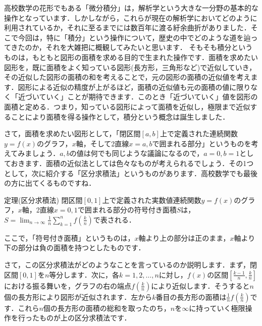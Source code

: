 


高校数学の花形でもある「微分積分」は，解析学という大きな一分野の基本的な操作となっています．しかしながら，これらが現在の解析学においてどのように利用されているか，それに至るまでには数百年に渡る紆余曲折がありました．そこで今回は，特に「積分」という操作について，歴史の中でどのような道を辿ってきたのか，それを大雑把に概観してみたいと思います．
そもそも積分というものは，もともと図形の面積を求める目的で生まれた操作です．面積を求めたい図形を，既に面積をよく知っている図形(長方形，三角形など)で近似していき，その近似した図形の面積の和を考えることで，元の図形の面積の近似値を考えます．図形による近似の精度が上がるほど，面積の近似値も元の面積の値に限りなく「近づいていく」ことが期待できます．このとき「近づいていく」値を図形の面積と定める．つまり，知っている図形によって面積を近似し，極限まで近似することにより面積を得る操作として，積分という概念は誕生しました．
\par さて，面積を求めたい図形として，「閉区間$[a,b]$上で定義された連続関数$y=f(x)$のグラフ，$x$軸，そして2直線$x=a,b$で囲まれる部分」というものを考えてみましょう．$a,b$の値は何でも同じような議論になるので，$a=0,b=1$としておきます．面積の近似法としては色々なものが考えられるでしょう．その1つとして，次に紹介する「区分求積法」というものがあります．高校数学でも最後の方に出てくるものですね．
\begin{itembox}[l]{定理(区分求積法)}
閉区間$[0,1]$上で定義された実数値連続関数$y=f(x)$のグラフ，$x$軸，2直線$x=0,1$で囲まれる部分の符号付き面積$S$は，$S=\displaystyle \lim_{n \to \infty}\frac{1}{n}\sum_{k=1}^n f\left(\frac{k}{n}\right)$で表される．
\end{itembox}
\par ここで，「符号付き面積」というものは，$x$軸より上の部分は正のまま，$x$軸より下の部分は負の面積を持つとしたものです．
\par さて，この区分求積法がどのようなことを言っているのか説明します．まず，閉区間$[0,1]$を$n$等分します．次に，各$k=1,2,\ldots ,n$に対し，$f(x)$の区間$\left[ \frac{k-1}{n},\frac{k}{n}\right]$における振る舞いを，グラフの右の端点$f\left(\frac{k}{n}\right)$により近似します．そうすると$n$個の長方形により図形が近似されます．左から$k$番目の長方形の面積は$\frac{1}{n}f\left(\frac{k}{n}\right)$です．これら$n$個の長方形の面積の総和を取ったのち，$n$を$\infty$に持っていく極限操作を行ったものが上の区分求積法です．
